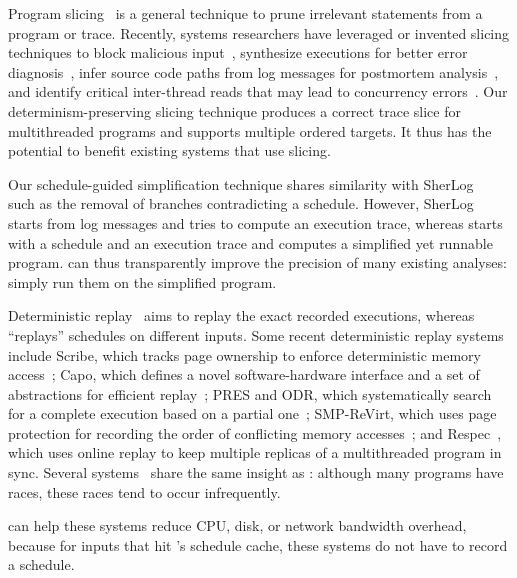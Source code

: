   Program slicing~\cite{Tip:slicing} is a general
technique to prune irrelevant statements from a program or trace.
Recently, systems researchers have leveraged or invented slicing
techniques to block malicious input~\cite{castro:bouncer}, synthesize
executions for better error diagnosis~\cite{esd:eurosys10}, infer source
code paths from log messages for postmortem
analysis~\cite{sherlog:asplos10}, and identify critical inter-thread reads
that may lead to concurrency errors~\cite{conseq:asplos11}.  
Our determinism-preserving slicing technique produces a correct trace slice for
multithreaded programs and supports multiple ordered targets.  It thus has
the potential to benefit existing systems that use slicing.  

Our schedule-guided simplification technique shares similarity with
SherLog~\cite{sherlog:asplos10} such as the removal of branches
contradicting a schedule.  However, SherLog starts from log messages and
tries to compute an execution trace, whereas \peregrine starts with a schedule
and an execution trace and computes a simplified yet runnable program.
\peregrine can thus transparently improve the precision of many existing
analyses: simply run them on the simplified program.


  Deterministic
replay~\cite{r2:osdi,friday2007,srinivasan:flashback,revirt,dejavu,vmware-record-replay,smp-revirt:vee08,pres:sosp09,scribe:sigmetrics10,odr:sosp09,capo:asplos09}
aims to replay the exact recorded executions, whereas \peregrine ``replays''
schedules on different inputs.  Some recent deterministic replay systems
include Scribe, which tracks page ownership to enforce deterministic
memory access~\cite{scribe:sigmetrics10}; Capo, which defines a novel
software-hardware interface and a set of abstractions for efficient
replay~\cite{capo:asplos09}; PRES and ODR, which systematically search for
a complete execution based on a partial one~\cite{pres:sosp09,odr:sosp09};
SMP-ReVirt, which uses page protection for recording the
order of conflicting memory accesses~\cite{smp-revirt:vee08}; and
Respec~\cite{respec:asplos10}, which uses online replay to keep multiple
replicas of a multithreaded program in sync.  Several
systems~\cite{pres:sosp09,respec:asplos10} share the same insight as \peregrine:
although many programs have races, these races tend to occur infrequently.

\peregrine can help these systems reduce CPU, disk, or network bandwidth
overhead, because for inputs that hit \peregrine's schedule cache, these systems
do not have to record a schedule.

